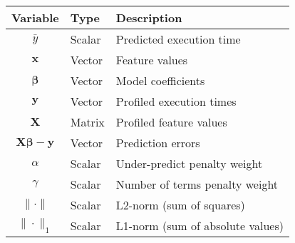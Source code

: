 \begin{tabular}{|c|l|l|}

\hline
Variable & Type & Description \\ \hline\hline
$\bar{y}$ & Scalar & Predicted execution time \\ \hline
$\textbf{x}$ & Vector & Feature values \\ \hline
$\boldsymbol{\beta}$ & Vector & Model coefficients \\ \hline\hline
$\textbf{y}$ & Vector & Profiled execution times \\ \hline
$\textbf{X}$ & Matrix & Profiled feature values \\ \hline
$\textbf{X}\boldsymbol{\beta} - \textbf{y}$ & Vector & Prediction errors \\ \hline\hline
$\alpha$ & Scalar & Under-predict penalty weight \\ \hline
$\gamma$ & Scalar & Number of terms penalty weight \\ \hline
$\|\cdot\|$ & Scalar & L2-norm (sum of squares) \\ \hline
$\|\cdot\|_1$ & Scalar & L1-norm (sum of absolute values) \\ \hline

\end{tabular}


